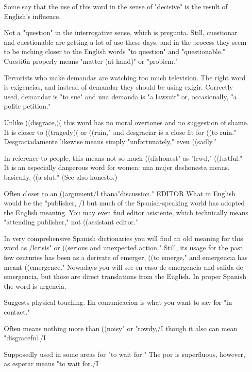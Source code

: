  Some say that the use of this word in the sense of
"decisive" is the result of English's influence.

 Not a "question" in the interrogative sense,
which is pregunta. Still, cuestionar and cuestionable are getting a
lot of use these days, and in the process they seem to be inching closer
to the English words "to question" and "questionable." Cuesti6n properly means "matter (at hand)" or "problem."

 Terrorists who make demandas are watching
too much television. The right word is exigencias, and instead of
demandar they should be using exigir. Correctly used, demandar is
"to sue" and una demanda is "a lawsuit" or, occasionally, "a polite
petition."

 Unlike ((disgrace,(( this word has no moral overtones and no suggestion of shame. It is closer to ((tragedy(( or ((ruin,"
and desgraciar is a close fit for ((to ruin." Desgraciadamente likewise
means simply "unfortunately," even ((sadly."

 In reference to people, this means not so
much ((dishonest" as "lewd," ((lustful." It is an especially dangerous
word for women: una mujer deshonesta means, basically, ((a slut."
(See also honesto.)

 Often closer to an ((argument/l thana"discussion."
EDITOR What in English would be the "publisher, /I but much
of the Spanish-speaking world has adopted the English meaning. You
may even find editor asistente, which technically means "attending
publisher," not ((assistant editor."

 In very comprehensive Spanish dictionaries
you will find an old meaning for this word as /lcrisis" or ((serious and
unexpected action." Still, its usage for the past few centuries has been
as a derivate of emerger, ((to emerge," and emergencia has meant
((emergence." Nowadays you will see en caso de emergencia and salida de emergencia, but those are direct translations from the English.
In proper Spanish the word is urgencia.

 Suggests physical touching. En comunicacion
is what you want to say for "in contact."

 Often means nothing more than ((noisy" or
"rowdy,/I though it also can mean "disgraceful./I

 Supposedly used in some areas for "to wait
for." The por is superfluous, however, as esperar means "to wait for./I

